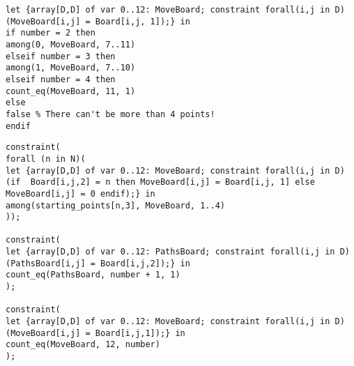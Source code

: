 \begin{verbatim}
let {array[D,D] of var 0..12: MoveBoard; constraint forall(i,j in D) (MoveBoard[i,j] = Board[i,j, 1]);} in
if number = 2 then
among(0, MoveBoard, 7..11)
elseif number = 3 then
among(1, MoveBoard, 7..10)
elseif number = 4 then
count_eq(MoveBoard, 11, 1)
else
false % There can't be more than 4 points!
endif
\end{verbatim}


\begin{verbatim}
constraint(
forall (n in N)(
let {array[D,D] of var 0..12: MoveBoard; constraint forall(i,j in D) (if  Board[i,j,2] = n then MoveBoard[i,j] = Board[i,j, 1] else MoveBoard[i,j] = 0 endif);} in
among(starting_points[n,3], MoveBoard, 1..4)
));

constraint(
let {array[D,D] of var 0..12: PathsBoard; constraint forall(i,j in D) (PathsBoard[i,j] = Board[i,j,2]);} in
count_eq(PathsBoard, number + 1, 1)
);

constraint(
let {array[D,D] of var 0..12: MoveBoard; constraint forall(i,j in D) (MoveBoard[i,j] = Board[i,j,1]);} in
count_eq(MoveBoard, 12, number)
);
    \end{verbatim}

